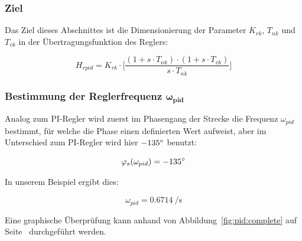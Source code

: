 \subsubsection*{Ziel}
Das Ziel  dieses Abschnittes ist  die Dimensionierung der  Parameter $K_{rk}$,
$T_{nk}$ und $T_{vk}$ in der \"Ubertragungsfunktion des Reglers:

\begin{equation} \label{eq:pid:target}
    H_{rpid} = K_{rk} \cdot \biggl[ \frac{(1 + s \cdot T_{nk}) \cdot (1 + s \cdot T_{vk}) }{ s \cdot T_{nk} } \biggr]
\end{equation}


\subsubsection{Bestimmung der Reglerfrequenz $\mathbf{\boldsymbol{\omega}_{pid}}$}

Analog  zum PI-Regler  wird  zuerst  im Phasengang  der  Strecke die  Frequenz
$\omega_{pid}$  bestimmt,  f\"ur  welche  die  Phase  einen  definierten  Wert
aufweist,  aber   im  Unterschied   zum  PI-Regler  wird   hier  $-135\degree$
benutzt\footnotemark[7]:

\begin{equation} \label{eq:pid:phi_s}
    \varphi_s(\omega_{pid}) = -135 \degree
\end{equation}


In unserem Beispiel ergibt dies:

\begin{equation} \label{eq:pid:omega_pid}
    \omega_{pid} = \SI{0.6714}{\per\second}
\end{equation}

Eine       graphische       \"Uberpr\"ufung        kann       anhand       von
Abbildung~\ref{fig:pid:complete}      auf     Seite~\pageref{fig:pid:complete}
durchgef\"uhrt werden.



